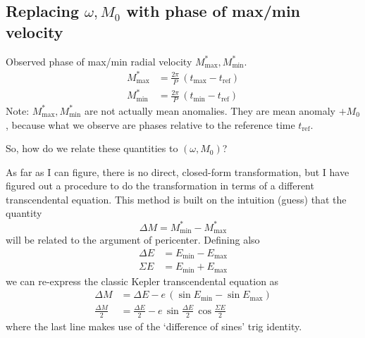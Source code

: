 \documentclass{article}
\begin{document}
\subsection{Replacing $\omega, M_0$ with phase of max/min velocity}

Observed phase of max/min radial velocity $M^*_{\mathrm{max}},
M^*_{\mathrm{min}}$.
\begin{align}
M^*_{\mathrm{max}} &= \frac{2\pi}{P} \, (t_{\mathrm{max}} - t_{\mathrm{ref}}) \\
M^*_{\mathrm{min}} &= \frac{2\pi}{P} \, (t_{\mathrm{min}} - t_{\mathrm{ref}})
\end{align}
Note: $M^*_{\mathrm{max}}, M^*_{\mathrm{min}}$ are not actually mean anomalies.
They are mean anomaly $+ M_0$, because what we observe are phases relative to
the reference time $t_{\mathrm{ref}}$.

So, how do we relate these quantities to $(\omega, M_0)$?

As far as I can figure, there is no direct, closed-form transformation, but I
have figured out a procedure to do the transformation in terms of a different
transcendental equation. This method is built on the intuition (guess) that the
quantity
\begin{equation}
    \Delta M = M^*_{\mathrm{min}} - M^*_{\mathrm{max}}
\end{equation}
will be related to the argument of pericenter. Defining also
\begin{align}
    \Delta E &= E_{\mathrm{min}} - E_{\mathrm{max}} \\
    \Sigma E &= E_{\mathrm{min}} + E_{\mathrm{max}}
\end{align}
we can re-express the classic Kepler transcendental equation as
\begin{align}
    \Delta M &= \Delta E - e\, (\sin E_{\mathrm{min}} - \sin E_{\mathrm{max}})\\
    \frac{\Delta M}{2} &= \frac{\Delta E}{2} - e\, \sin\frac{\Delta E}{2} \, \cos\frac{\Sigma E}{2}
\end{align}
where the last line makes use of the `difference of sines' trig identity.
\end{document}
